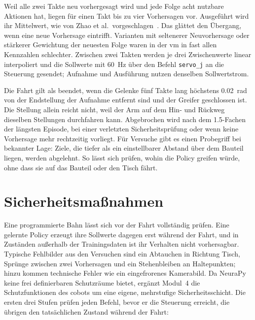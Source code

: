 Weil alle zwei Takte neu vorhergesagt wird und jede Folge acht nutzbare Aktionen hat, liegen für
einen Takt bis zu vier Vorhersagen vor. Ausgeführt wird ihr Mittelwert, wie von Zhao et al.\
vorgeschlagen~\cite{zhao2023}. Das glättet den Übergang, wenn eine neue Vorhersage eintrifft.
Varianten mit seltenerer Neuvorhersage oder stärkerer Gewichtung der neuesten Folge waren in der
\ac{vm} in fast allen Kennzahlen schlechter. Zwischen zwei Takten werden je drei Zwischenwerte
linear interpoliert und die Sollwerte mit \SI{60}{\hertz} über den Befehl \texttt{servo\_j} an die
Steuerung gesendet; Aufnahme und Ausführung nutzen denselben Sollwertstrom.

Die Fahrt gilt als beendet, wenn die Gelenke fünf Takte lang höchstens \SI{0.02}{rad} von der
Endstellung der Aufnahme entfernt sind und der Greifer geschlossen ist. Die Stellung allein
reicht nicht, weil der Arm auf dem Hin- und Rückweg dieselben Stellungen durchfahren kann.
Abgebrochen wird nach dem \num{1.5}-Fachen der längsten Episode, bei einer verletzten
Sicherheitsprüfung oder wenn keine Vorhersage mehr rechtzeitig vorliegt. Für Versuche gibt es
einen Probegriff bei bekannter Lage: Ziele, die tiefer als ein einstellbarer Abstand über dem
Bauteil liegen, werden abgelehnt. So lässt sich prüfen, wohin die Policy greifen würde, ohne dass
sie auf das Bauteil oder den Tisch fährt.

\section{Sicherheitsmaßnahmen}
\label{sec:m4-sicherheit}

Eine programmierte Bahn lässt sich vor der Fahrt vollständig prüfen. Eine gelernte Policy erzeugt
ihre Sollwerte dagegen erst während der Fahrt, und in Zuständen außerhalb der Trainingsdaten ist
ihr Verhalten nicht vorhersagbar. Typische Fehlbilder aus den Versuchen sind ein Abtauchen in
Richtung Tisch, Sprünge zwischen zwei Vorhersagen und ein Stehenbleiben an Haltepunkten; hinzu
kommen technische Fehler wie ein eingefrorenes Kamerabild. Da NeuraPy keine frei definierbaren
Schutzräume bietet, ergänzt Modul~4 die Schutzfunktionen des \ac{cobot}s um eine eigene,
mehrstufige Sicherheitsschicht. Die ersten drei Stufen prüfen jeden Befehl, bevor er die Steuerung
erreicht, die übrigen den tatsächlichen Zustand während der Fahrt:

